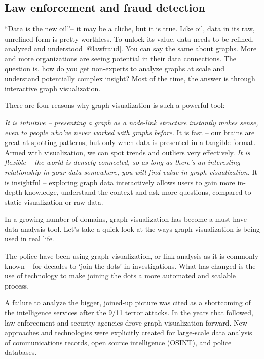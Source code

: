 \documentclass[]{book}
\theoremstyle{definition}
\theoremstyle{definition}
\theoremstyle{definition}
\theoremstyle{remark}
\begin{document}
\subsection{Law enforcement and fraud
detection}\label{law-enforcement-and-fraud-detection}

``Data is the new oil''-- it may be a cliche, but it is true. Like oil,
data in its raw, unrefined form is pretty worthless. To unlock its
value, data needs to be refined, analyzed and understood
{[}@lawfraud{]}. You can say the same about graphs. More and more
organizations are seeing potential in their data connections. The
question is, how do you get non-experts to analyze graphs at scale and
understand potentially complex insight? Most of the time, the answer is
through interactive graph visualization.

There are four reasons why graph visualization is such a powerful tool:

\emph{It is intuitive -- presenting a graph as a node-link structure
instantly makes sense, even to people who've never worked with graphs
before. }It is fast -- our brains are great at spotting patterns, but
only when data is presented in a tangible format. Armed with
visualization, we can spot trends and outliers very effectively.
\emph{It is flexible -- the world is densely connected, so as long as
there's an interesting relationship in your data somewhere, you will
find value in graph visualization. }It is insightful -- exploring graph
data interactively allows users to gain more in-depth knowledge,
understand the context and ask more questions, compared to static
visualization or raw data.

In a growing number of domains, graph visualization has become a
must-have data analysis tool. Let's take a quick look at the ways graph
visualization is being used in real life.

The police have been using graph visualization, or link analysis as it
is commonly known -- for decades to `join the dots' in investigations.
What has changed is the use of technology to make joining the dots a
more automated and scalable process.

A failure to analyze the bigger, joined-up picture was cited as a
shortcoming of the intelligence services after the 9/11 terror attacks.
In the years that followed, law enforcement and security agencies drove
graph visualization forward. New approaches and technologies were
explicitly created for large-scale data analysis of communications
records, open source intelligence (OSINT), and police databases.
\end{document}
